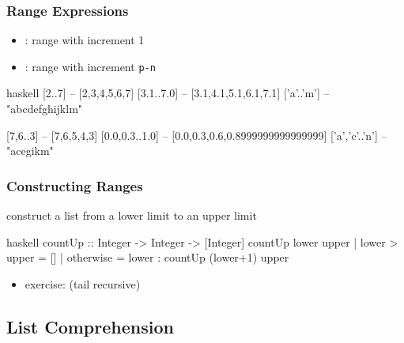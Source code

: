 \documentclass[dvipsnames]{beamer}
\theoremstyle{plain}
\begin{document}
\begin{frame}[fragile]
  \frametitle{Range Expressions}

  \begin{itemize}
    \item {}: range with increment 1
    \item {}: range with increment \texttt{p-n}
  \end{itemize}

  \begin{exampleblock}{}
    \begin{pygments}{haskell}
[2..7]          -- [2,3,4,5,6,7]
[3.1..7.0]      -- [3.1,4.1,5.1,6.1,7.1]
['a'..'m']      -- "abcdefghijklm"

[7,6..3]        -- [7,6,5,4,3]
[0.0,0.3..1.0]  -- [0.0,0.3,0.6,0.8999999999999999]
['a','c'..'n']  -- "acegikm"
    \end{pygments}
  \end{exampleblock}
\end{frame}

\begin{frame}[fragile]
  \frametitle{Constructing Ranges}

  \begin{exampleblock}{construct a list from a lower limit to an upper limit}
    \begin{pygments}{haskell}
countUp :: Integer -> Integer -> [Integer]
countUp lower upper
  | lower > upper = []
  | otherwise     = lower : countUp (lower+1) upper
    \end{pygments}
  \end{exampleblock}

  \pause
  \begin{itemize}
    \item exercise:  (tail recursive)
  \end{itemize}
\end{frame}

\subsection{List Comprehension}
\end{document}
